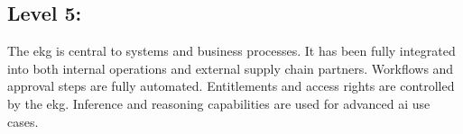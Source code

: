 \subsection{Level 5: \ekgmmLevelFiveLabel}

The \gls{ekg} is central to systems and business processes.
It has been fully integrated into both internal operations and external supply chain partners.
Workflows and approval steps are fully automated.
Entitlements and access rights are controlled by the \gls{ekg}.
Inference and reasoning capabilities are used for advanced \gls{ai} use cases.
